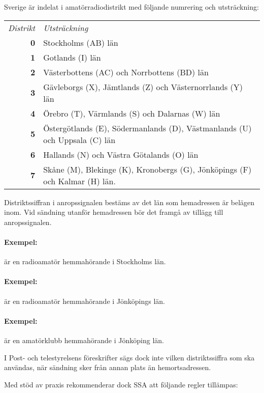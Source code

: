Sverige är indelat i amatörradiodistrikt med följande numrering och
utsträckning:

\begin{center}
\begin{tabular}{rp{6cm}}
\emph{Distrikt} & \emph{Utsträckning} \\
\textbf{0} & Stockholms (AB) län \\
\textbf{1} & Gotlands (I) län \\
\textbf{2} & Västerbottens (AC) och Norrbottens (BD) län \\
\textbf{3} & Gävleborgs (X), Jämtlands (Z) och Västernorrlands (Y) län \\
\textbf{4} & Örebro (T), Värmlands (S) och Dalarnas (W) län \\
\textbf{5} & Östergötlands (E), Södermanlands (D), Västmanlands (U) och Uppsala (C) län\\
\textbf{6} & Hallands (N) och Västra Götalands (O) län \\
\textbf{7} & Skåne (M), Blekinge (K), Kronobergs (G), Jönköpings (F) och Kalmar (H) län.\\
\end{tabular}
\end{center}

Distriktssiffran i anropssignalen bestäms av det län som hemadressen är belägen inom.
Vid sändning utanför hemadressen bör det framgå av tillägg till anropssignalen.
\paragraph{Exempel:}  är en radioamatör hemmahörande i Stockholms län.

\paragraph{Exempel:}  är en radioamatör hemmahörande i Jönköpings län.

\paragraph{Exempel:}  är en amatörklubb hemmahörande i Jönköping län.
\medskip

I Post- och telestyrelsens föreskrifter sägs dock inte vilken distriktssiffra
som ska användas, när sändning sker från annan plats än hemortsadressen.

Med stöd av praxis rekommenderar dock SSA att följande regler tillämpas:

